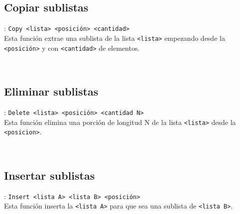       \subsection*{Copiar sublistas}: \texttt{Copy <lista>~<posición>~<cantidad>}\\
      Esta función extrae una sublista de la lista \texttt{<lista>} empezando desde la \texttt{<posición>} y con \texttt{<cantidad>} de elementos.
      
      \begin{fxcode}
         \\
      \end{fxcode}
      
      \subsection*{Eliminar sublistas}: \texttt{Delete <lista>~<posición>~<cantidad N>}\\
      Esta función elimina una porción de longitud N de la lista \texttt{<lista>} desde la \texttt{<posicion>}.
      
      \begin{fxcode}
         \\
      \end{fxcode}
      
      \subsection*{Insertar sublistas}: \texttt{Insert <lista A>~<lista B>~<posición>}\\
      Esta función inserta la \texttt{<lista A>} para que sea una sublista de \texttt{<lista B>}.
      
      \begin{fxcode}
         \\
      \end{fxcode}
      
